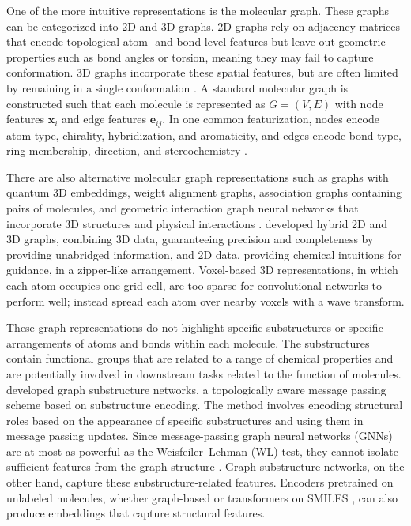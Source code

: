 One of the more intuitive representations is the molecular graph. These graphs can be categorized into 2D and 3D graphs. 2D graphs rely on adjacency matrices that encode topological atom- and bond-level features but leave out geometric properties such as bond angles or torsion, meaning they may fail to capture conformation. 3D graphs incorporate these spatial features, but are often limited by remaining in a single conformation \citep{Zhichun2023}. A standard molecular graph is constructed such that each molecule is represented as $G = (V,E)$ with node features $\mathbf{x}_i$ and edge features $\mathbf{e}_{ij}$. In one common featurization, nodes encode atom type, chirality, hybridization, and aromaticity, and edges encode bond type, ring membership, direction, and stereochemistry \citep{Zhichun2023}. 

There are also alternative molecular graph representations such as graphs with quantum 3D embeddings, weight alignment graphs, association graphs containing pairs of molecules, and geometric interaction graph neural networks that incorporate 3D structures and physical interactions \citep{Hnig2022, yan2023, Yang2023GIGN}. \citet{Du2022} developed hybrid 2D and 3D graphs, combining 3D data, guaranteeing precision and completeness by providing unabridged information, and 2D data, providing chemical intuitions for guidance, in a zipper-like arrangement. Voxel-based 3D representations, in which each atom occupies one grid cell, are too sparse for convolutional networks to perform well; \citet{Kuzminykh2018} instead spread each atom over nearby voxels with a wave transform.
      
These graph representations do not highlight specific substructures or specific arrangements of atoms and bonds within each molecule. The substructures contain functional groups that are related to a range of chemical properties and are potentially involved in downstream tasks related to the function of molecules. \citet{Bouritsas2023} developed graph substructure networks, a topologically aware message passing scheme based on substructure encoding. The method involves encoding structural roles based on the appearance of specific substructures and using them in message passing updates. Since message-passing graph neural networks (GNNs) are at most as powerful as the Weisfeiler--Lehman (WL) test, they cannot isolate sufficient features from the graph structure \citep{Bouritsas2023}. Graph substructure networks, on the other hand, capture these substructure-related features. Encoders pretrained on unlabeled molecules, whether graph-based \citep{kishimoto2023} or transformers on SMILES \citep{ross2022}, can also produce embeddings that capture structural features. 

